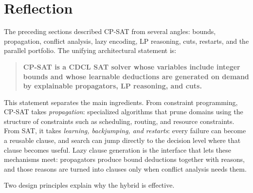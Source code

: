 \section{Reflection}\label{part:reflection}

The preceding sections described CP-SAT from several angles: bounds, propagation,
conflict analysis, lazy encoding, LP reasoning, cuts, restarts, and the parallel
portfolio. The unifying architectural statement is:

\begin{quote}
\textbf{CP-SAT is a CDCL SAT solver whose variables include integer bounds and
whose learnable deductions are generated on demand by explainable propagators,
LP reasoning, and cuts.}
\end{quote}

This statement separates the main ingredients. From constraint programming,
CP-SAT takes \emph{propagation}: specialized algorithms that prune domains using
the structure of constraints such as scheduling, routing, and resource
constraints. From SAT, it takes \emph{learning, backjumping, and restarts}: every
failure can become a reusable clause, and search can jump directly to the
decision level where that clause becomes useful. Lazy clause generation is the
interface that lets these mechanisms meet: propagators produce bound deductions
together with reasons, and those reasons are turned into clauses only when
conflict analysis needs them.

Two design principles explain why the hybrid is effective.

